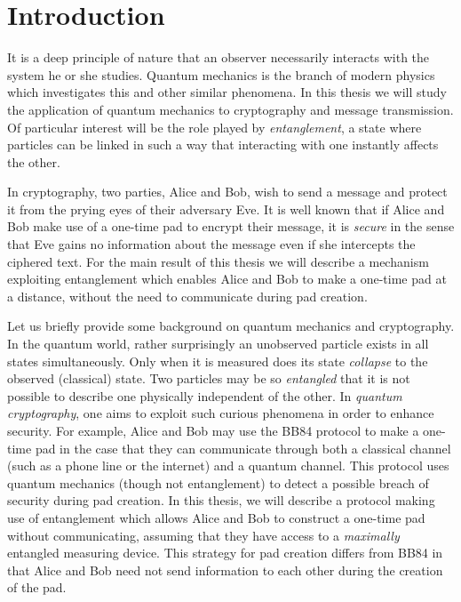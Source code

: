 
\chapter{Introduction} %

\label{Chapter1-introduction} %


\newcommand{\keyword}[1]{\textbf{#1}}
\newcommand{\tabhead}[1]{\textbf{#1}}
\newcommand{\code}[1]{\texttt{#1}}
\newcommand{\file}[1]{\texttt{\bfseries#1}}
\newcommand{\option}[1]{\texttt{\itshape#1}}

It is a deep principle of nature that an observer necessarily interacts with the system he or she studies. Quantum mechanics is the branch of modern physics which investigates this and other similar phenomena. In this thesis we will study the application of quantum mechanics to cryptography and message transmission. Of particular interest will be the role played by {\emph{entanglement}}, a state where particles can be linked in such a way that interacting with one instantly affects the other. 

In cryptography, two parties, Alice and Bob, wish to send a message and protect it from the prying eyes of their adversary Eve. It is well known that if Alice and Bob make use of a one-time pad to encrypt their message, it is \emph{secure} in the sense that Eve gains no information about the message even if she intercepts the ciphered text. For the main result of this thesis we will describe a mechanism exploiting entanglement which enables Alice and Bob to make a one-time pad at a distance, without the need to communicate during pad creation. 

Let us briefly provide some background on quantum mechanics and cryptography.  In the quantum world, rather surprisingly an unobserved particle exists in all states simultaneously.  Only when it is measured does its state {\emph{collapse}} to the observed (classical) state.  Two particles may be so {\emph{entangled}} that it is not possible to describe one physically independent of the other.  In {\emph{quantum cryptography}}, one aims to exploit such curious phenomena in order to enhance security.  For example, Alice and Bob may use the BB84 protocol to make a one-time pad in the case that they can communicate through both a classical channel (such as a phone line or the internet) and a quantum channel. This protocol uses quantum mechanics (though not entanglement) to detect a possible breach of security during pad creation.  In this thesis, we will describe a protocol making use of entanglement which allows Alice and Bob to construct a one-time pad without communicating, assuming that they have access to a {\emph{maximally}} entangled measuring device.  This strategy for pad creation differs from BB84 in that Alice and Bob need not send information to each other during the creation of the pad.

